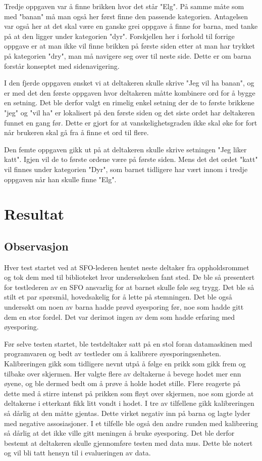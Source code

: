  
Tredje oppgaven var å finne brikken hvor det står "Elg". På samme måte som med "banan" må man også her først finne den passende kategorien. Antagelsen var også her at det skal være en ganske grei oppgave å finne for barna, med tanke på at den ligger under kategorien "dyr". Forskjellen her i forhold til forrige oppgave er at man ikke vil finne brikken på første siden etter at man har trykket på kategorien "dry", man må navigere seg over til neste side. Dette er om barna forstår konseptet med sidenavigering.
 
 
I den fjerde oppgaven ønsket vi at deltakeren skulle skrive "Jeg vil ha banan", og er med det den første oppgaven hvor deltakeren måtte kombinere ord for å bygge en setning. Det ble derfor valgt en rimelig enkel setning der de to første brikkene "jeg" og "vil ha" er lokalisert på den første siden og det siste ordet har deltakeren funnet en gang før. Dette er gjort for at vanskelighetsgraden ikke skal øke for fort når brukeren skal gå fra å finne et ord til flere.
 
 
Den femte oppgaven gikk ut på at deltakeren skulle skrive setningen "Jeg liker katt". Igjen vil de to første ordene være på første siden. Mens det det ordet "katt" vil finnes under kategorien "Dyr", som barnet tidligere har vært innom i tredje oppgaven når han skulle finne "Elg". 
 
 
\section{Resultat} 
 
 
\subsection{Observasjon} 
 
 
Hver test startet ved at SFO-lederen hentet neste deltaker fra oppholdsrommet og tok dem med til biblioteket hvor undersøkelsen fant sted. De ble så presentert for testlederen av en SFO ansvarlig for at barnet skulle føle seg trygg. Det ble så stilt et par spørsmål, hovedsakelig for å lette på stemningen. Det ble også undersøkt om noen av barna hadde prøvd øyesporing før, noe som hadde gitt dem en stor fordel. Det var derimot ingen av dem som hadde erfaring med øyesporing. 
 
 
Før selve testen startet, ble testdeltaker satt på en stol foran datamaskinen med programvaren og bedt av testleder om å kalibrere øyesporingsenheten. Kalibreringen gikk som tidligere nevnt utpå å følge en prikk som gikk frem og tilbake over skjermen. Her valgte flere av deltakerne å bevege hodet mer enn øyene, og ble dermed bedt om å prøve å holde hodet stille. Flere reagerte på dette med å stirre intenst på prikken som fløyt over skjermen, noe som gjorde at deltakerne i etterkant fikk litt vondt i hodet. I tre av tilfellene gikk kalibreringen så dårlig at den måtte gjentas. Dette virket negativ inn på barna og lagte lyder med negative assosiasjoner. I et tilfelle ble også den andre runden med kalibrering så dårlig at det ikke ville gitt meningen å bruke øyesporing. Det ble derfor bestemt at deltakeren skulle gjennomføre testen med data mus. Dette ble notert og vil bli tatt hensyn til i evalueringen av data. 
 
